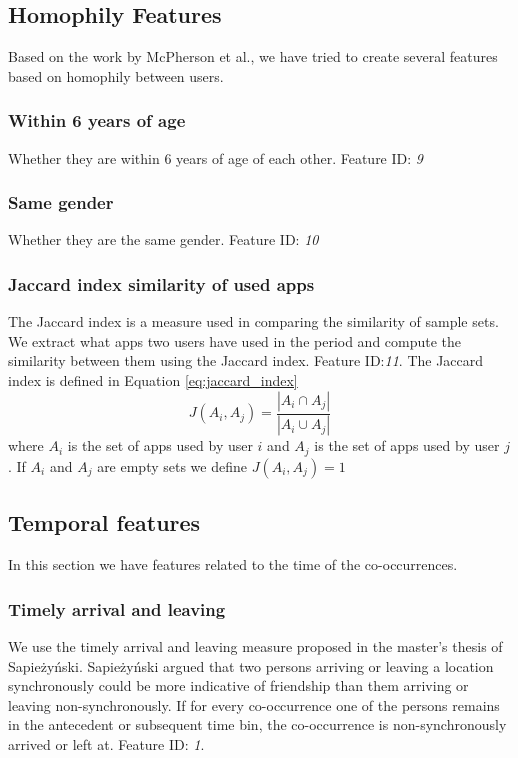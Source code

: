 \subsection{Homophily Features}
Based on the work by McPherson et al.\cite{mcpherson2001birds}, we have tried to create several features based on homophily between users.

\subsubsection{Within 6 years of age}
Whether they are within 6 years of age of each other. Feature ID: \textit{9}

\subsubsection{Same gender}
Whether they are the same gender. Feature ID: \textit{10}

\subsubsection{Jaccard index similarity of used apps}
The Jaccard index is a measure used in comparing the similarity of sample sets. We extract what apps two users have used in the period and compute the similarity between them using the Jaccard index. Feature ID:\textit{11}.
The Jaccard index is defined in Equation \ref{eq:jaccard_index}
\begin{equation}
\label{eq:jaccard_index}
J(A_i,A_j) = \frac{ |A_i \cap A_j| }{ |A_i \cup A_j | }
\end{equation}
where $A_i$ is the set of apps used by user $i$ and $A_j$ is the set of apps used by user $j$. If $A_i$ and $A_j$ are empty sets we define $J(A_i, A_j) = 1$

\subsection{Temporal features}
In this section we have features related to the time of the co-occurrences.

\subsubsection{Timely arrival and leaving}
We use the timely arrival and leaving measure proposed in the master's thesis of Sapieżyński\cite{IMM2013-06556}.
Sapieżyński argued that two persons arriving or leaving a location synchronously could be more indicative of friendship than them arriving or leaving non-synchronously. If for every co-occurrence one of the persons remains in the antecedent or subsequent time bin, the co-occurrence is non-synchronously arrived or left at.
Feature ID: \textit{1}.

